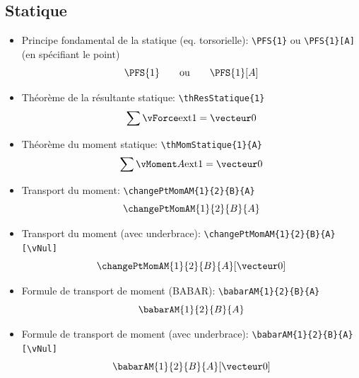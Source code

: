 \documentclass[11pt]{ltxdockit}[2010/09/26]
\begin{document}
\subsection{Statique}
\begin{itemize}
\item Principe fondamental de la statique (eq. torsorielle): \verb!\PFS{1}! ou \verb!\PFS{1}[A]! (en spécifiant le point)
\[ \PFS{1} \qquad \text{ou} \qquad \PFS{1}[A] \]
\item Théorème de la résultante statique: \verb!\thResStatique{1}!
\[ \thResStatique{1} \]
\item Théorème du moment statique: \verb!\thMomStatique{1}{A}!
\[ \thMomStatique{1}{A} \]
\item Transport du moment: \verb!\changePtMomAM{1}{2}{B}{A}!
\[ \changePtMomAM{1}{2}{B}{A} \]
\item Transport du moment (avec underbrace): \verb!\changePtMomAM{1}{2}{B}{A}[\vNul]!
\[ \changePtMomAM{1}{2}{B}{A}[\vNul] \]
\item Formule de transport de moment (BABAR): \verb!\babarAM{1}{2}{B}{A}!
\[ \babarAM{1}{2}{B}{A} \]
\item Formule de transport de moment (avec underbrace): \verb!\babarAM{1}{2}{B}{A}[\vNul]!
\[ \babarAM{1}{2}{B}{A}[\vNul] \]
\end{itemize}
\end{document}
